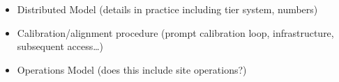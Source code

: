 \documentclass [draft,notitlepage] {article}
\begin{document}
\begin{itemize}

\item Distributed Model (details in practice including tier system, numbers)


\item Calibration/alignment procedure (prompt calibration loop,
  infrastructure, subsequent access\ldots)




\item Operations Model (does this include site operations?)






\end{itemize}
\end{document}
